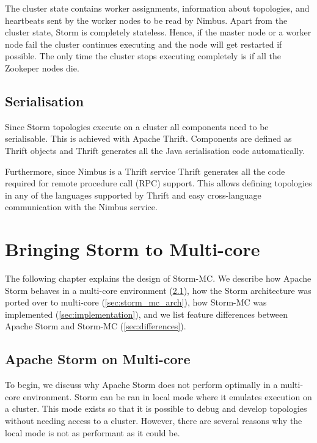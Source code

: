 \documentclass[bsc,logo,frontabs,twoside,singlespacing,normalheadings,parskip]{infthesis}\usepackage[]{graphicx}\usepackage[]{color}
\begin{document}
The cluster state contains worker assignments, information about topologies, and heartbeats sent by the worker nodes to be read by Nimbus. Apart from the cluster state, Storm is completely stateless. Hence, if the master node or a worker node fail the cluster continues executing and the node will get restarted if possible. The only time the cluster stops executing  completely is if all the Zookeper nodes die.

\section{Serialisation}
\label{sec:serialisation}

Since Storm topologies execute on a cluster all components need to be serialisable. This is achieved with Apache Thrift. Components are defined as Thrift objects and Thrift generates all the Java serialisation code automatically.

Furthermore, since Nimbus is a Thrift service Thrift generates all the code required for remote procedure call (RPC) support. This allows defining topologies in any of the languages supported by Thrift and easy cross-language communication with the Nimbus service.
\clearpage{}

\clearpage{}\chapter{Bringing Storm to Multi-core}

The following chapter explains the design of Storm-MC. We describe how Apache Storm behaves in a multi-core environment (\ref{sec:storm_on_mc}), how the Storm architecture was ported over to multi-core (\ref{sec:storm_mc_arch}), how Storm-MC was implemented  (\ref{sec:implementation}), and we list feature differences between Apache Storm and Storm-MC (\ref{sec:differences}).

\section{Apache Storm on Multi-core}
\label{sec:storm_on_mc}

To begin, we discuss why Apache Storm does not perform optimally in a multi-core environment. Storm can be ran in local mode where it emulates execution on a cluster. This mode exists so that it is possible to debug and develop topologies without needing access to a cluster. However, there are several reasons why the local mode is not as performant as it could be.
\end{document}
